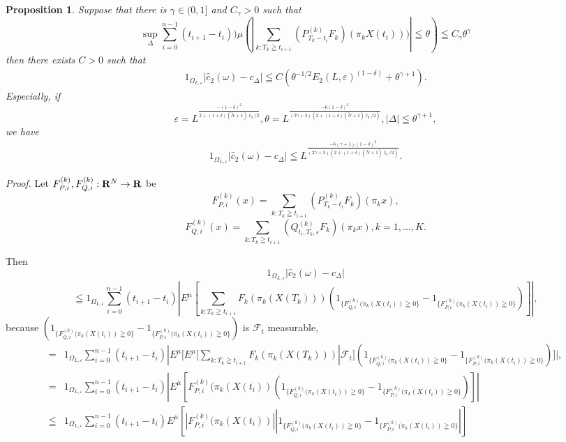 \documentclass[12pt]{article}
\newtheorem{prop}[thm]{Proposition}%
\begin{document}
\begin{prop}
Suppose that there is $ \gamma \in (0,1]$  and $C_{\gamma} >0$ such that
  $$\sup_{\Delta} \sum_{i=0}^{n-1} (t_{i+1}-t_i)){\mu} (| \sum_{k:T_k\geqq t_{i+1}} (P_{T_k-t_i}^{(k)}F_k)(\pi_k X(t_i)))| \leqq \theta ) \leqq C_{\gamma}\theta^{\gamma}$$
then there exists $C>0$ such that
\begin{align*}
1_{\Omega_{L, \varepsilon} }|\hat{c}_2(\omega)-c_{\Delta}|
\leqq C \left( \theta^{-1/2} E_2(L,  \varepsilon)^{(1-\delta)}+\theta^{\gamma+1}\right).
\end{align*}
Especially, if 
$$\varepsilon = L^{\frac{-(1-\delta)^2}{{2+(1+\delta)(\tilde{N}+1)\ell_0/2}} }, \theta =  L^{\frac{-6(1-\delta)^2}{ (2\gamma+3) (2+(1+\delta)(\tilde{N}+1)\ell_0/2) } }, |\Delta| \leqq \theta^{\gamma+1}, $$
we have
\begin{align*}
1_{\Omega_{L, \varepsilon} }|\hat{c}_2(\omega)-c_{\Delta}|
\leqq L^{\frac{-6(\gamma+1)(1-\delta)^2}{ (2\gamma+3) (2+(1+\delta)(\tilde{N}+1)\ell_0/2) } }.
\end{align*}
\end{prop}
{\it Proof.}
Let $F^{(k)}_{P,i }, F^{(k)}_{Q,i }: {\bf R}^N \to {\bf R}$ be
$$F^{(k)}_{P,i }(x) = \sum_{k:T_k\geqq t_{i+1}} (P_{T_k-t_i}^{(k)} F_k) (\pi_k x),$$
$$F^{(k)}_{Q,i }(x)=\sum_{k:T_k\geqq t_{i+1} } (Q_{t_i,T_k, \varepsilon}^{(k)}F_k)(\pi_k x), k=1,\ldots,K.$$
 
Then
$$1_{\Omega_{L, \varepsilon} }|\hat{c}_2(\omega)-c_{\Delta}|$$
 $$
  \leqq 1_{\Omega_{L, \varepsilon} } \sum_{i=0}^{n-1}(t_{i+1}-t_i)
|E ^{\mu}[\sum_{k:T_k\geqq t_{i+1}}F_k (\pi_k (X(T_k)))
(1_{\{F^{(k)}_{Q,i}(\pi_k (X(t_i)) \geqq 0\}} -1_{\{F^{(k)}_{P,i}(\pi_k (X(t_i)) \geqq 0\}})]|,$$
 because $(1_{\{F^{(k)}_{Q,i}(\pi_k (X(t_i)) \geqq 0\}} -1_{\{F^{(k)}_{P,i}(\pi_k (X(t_i)) \geqq 0\}})$ is $\mathcal{F}_t$ measurable,
  \begin{align*} 
= &1_{\Omega_{L, \varepsilon} } \sum_{i=0}^{n-1}(t_{i+1}-t_i)
|E^{\mu}[ E ^{\mu}[\sum_{k:T_k\geqq t_{i+1}}F_k (\pi_k (X(T_k))) | \mathcal{F}_t]
(1_{\{F^{(k)}_{Q,i}(\pi_k (X(t_i)) \geqq 0\}} -1_{\{F^{(k)}_{P,i}(\pi_k (X(t_i)) \geqq 0\}})]|,\\
= &1_{\Omega_{L, \varepsilon} } \sum_{i=0}^{n-1}(t_{i+1}-t_i)
|E ^{\mu}[F^{(k)}_{P,i}(\pi_k (X(t_i))
(1_{\{F^{(k)}_{Q,i}(\pi_k (X(t_i)) \geqq 0\}} -1_{\{F^{(k)}_{P,i}(\pi_k (X(t_i)) \geqq 0\}})]|\\
   \leqq &1_{\Omega_{L, \varepsilon} } \sum_{i=0}^{n-1}(t_{i+1}-t_i)
E ^{\mu}[|F^{(k)}_{P,i}(\pi_k (X(t_i))| 
|1_{\{F^{(k)}_{Q,i}(\pi_k (X(t_i)) \geqq 0\}} -1_{\{F^{(k)}_{P,i}(\pi_k (X(t_i)) \geqq 0\}}|]
 \end{align*}
 
\end{document}
